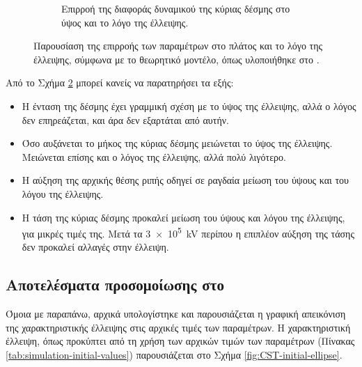 \begin{figure}[tph]
\begin{subfigure}{0.47\textwidth}
		\centering
		\caption{Επιρροή της διαφοράς δυναμικού της κύριας δέσμης στο ύψος και το λόγο της έλλειψης.}
		\label{fig:EBS-variables-voltage-linear}
	\end{subfigure}
\caption{Παρουσίαση της επιρροής των παραμέτρων στο πλάτος και το λόγο της έλλειψης, σύμφωνα με το θεωρητικό μοντέλο, όπως υλοποιήθηκε στο .}	
\label{fig:EBS-MATLAB-variables}
\end{figure}

Από το Σχήμα \ref{fig:EBS-MATLAB-variables} μπορεί κανείς να παρατηρήσει τα εξής:
\begin{itemize}
\item Η ένταση της δέσμης έχει γραμμική σχέση με το ύψος της έλλειψης, αλλά ο λόγος δεν επηρεάζεται, και άρα δεν εξαρτάται από αυτήν.
\item Όσο αυξάνεται το μήκος της κύριας δέσμης μειώνεται το ύψος της έλλειψης.
Μειώνεται επίσης και ο λόγος της έλλειψης, αλλά πολύ λιγότερο.
\item Η αύξηση της αρχικής θέσης ριπής οδηγεί σε ραγδαία μείωση του ύψους και του λόγου της έλλειψης.
\item Η τάση της κύριας δέσμης προκαλεί μείωση του ύψους και λόγου της έλλειψης, για μικρές τιμές της. 
Μετά τα \SI{3e5}{\kilo \volt} περίπου η επιπλέον αύξηση της τάσης δεν προκαλεί αλλαγές στην έλλειψη.
\end{itemize}


\subsection{Αποτελέσματα προσομοίωσης στο }

Όμοια με παραπάνω, αρχικά υπολογίστηκε και παρουσιάζεται η γραφική απεικόνιση της χαρακτηριστικής έλλειψης στις αρχικές τιμές των παραμέτρων.
Η χαρακτηριστική έλλειψη, όπως προκύπτει από τη χρήση των αρχικών τιμών των παραμέτρων (Πίνακας \ref{tab:simulation-initial-values}) παρουσιάζεται στο Σχήμα \ref{fig:CST-initial-ellipse}.

